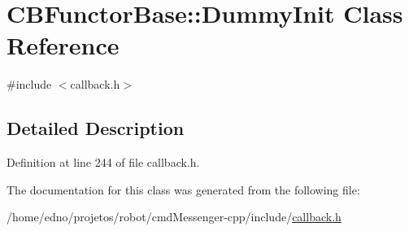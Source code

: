 \hypertarget{class_c_b_functor_base_1_1_dummy_init}{\section{C\+B\+Functor\+Base\+:\+:Dummy\+Init Class Reference}
\label{class_c_b_functor_base_1_1_dummy_init}
}


{\ttfamily \#include $<$callback.\+h$>$}



\subsection{Detailed Description}


Definition at line 244 of file callback.\+h.



The documentation for this class was generated from the following file\+:\begin{DoxyCompactItemize}
\item 
/home/edno/projetos/robot/cmd\+Messenger-\/cpp/include/\hyperlink{callback_8h}{callback.\+h}\end{DoxyCompactItemize}
